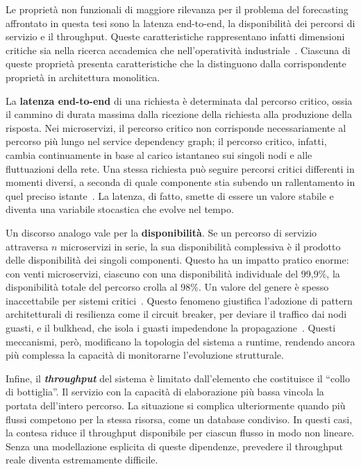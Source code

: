 Le proprietà non funzionali di maggiore rilevanza per il problema del forecasting affrontato 
in questa tesi sono la latenza end-to-end, la disponibilità dei percorsi di servizio e il 
throughput. Queste caratteristiche rappresentano infatti dimensioni critiche sia nella ricerca 
accademica che nell'operatività industriale~\cite{auer2021}. Ciascuna di queste proprietà presenta 
caratteristiche che la distinguono dalla corrispondente proprietà in architettura monolitica.

La \textbf{latenza end-to-end} di una richiesta è determinata dal percorso critico, ossia
il cammino di durata massima dalla ricezione della richiesta alla produzione della risposta.
Nei microservizi, il percorso critico non corrisponde necessariamente al percorso più lungo
nel service dependency graph; il percorso critico, infatti, cambia continuamente in base al
carico istantaneo sui singoli nodi e alle fluttuazioni della rete. Una stessa richiesta può
seguire percorsi critici differenti in momenti diversi, a seconda di quale componente stia
subendo un rallentamento in quel preciso istante~\cite{qiu2020firm}. La latenza, di fatto,
smette di essere un valore stabile e diventa una variabile stocastica che evolve nel tempo.

Un discorso analogo vale per la \textbf{disponibilità}. Se un percorso di servizio attraversa
$n$ microservizi in serie, la sua disponibilità complessiva è il prodotto delle disponibilità
dei singoli componenti. Questo ha un impatto pratico enorme:
con venti microservizi, ciascuno con una disponibilità individuale del 99,9\%, la disponibilità
totale del percorso crolla al 98\%. Un valore del genere è spesso inaccettabile per sistemi
critici~\cite{gan2019deathstar}. Questo fenomeno giustifica l'adozione di pattern
architetturali di resilienza come il circuit breaker, per deviare il traffico dai nodi guasti,
e il bulkhead, che isola i guasti impedendone la propagazione~\cite{qiu2020firm}. Questi
meccanismi, però, modificano la topologia del sistema a runtime, rendendo ancora più complessa
la capacità di monitorarne l'evoluzione strutturale.

Infine, il \textbf{\textit{throughput}} del sistema è limitato dall'elemento che costituisce il
``collo di bottiglia''. Il servizio con la capacità di elaborazione più bassa vincola la
portata dell'intero percorso. La situazione si complica ulteriormente quando più flussi
competono per la stessa risorsa, come un database condiviso. In questi casi, la contesa riduce
il throughput disponibile per ciascun flusso in modo non lineare. Senza una modellazione
esplicita di queste dipendenze, prevedere il throughput reale diventa estremamente difficile.

